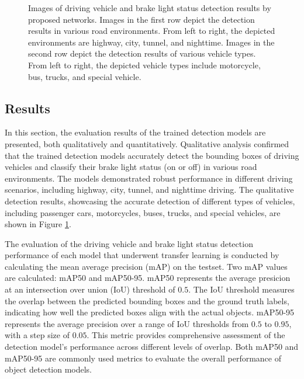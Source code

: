 \begin{figure}[t]%

    \hfill

\caption{Images of driving vehicle and brake light status detection results by proposed networks. Images in the first row depict the detection results in various road environments. From left to right, the depicted environments are highway, city, tunnel, and nighttime. Images in the second row depict the detection results of various vehicle types. From left to right, the depicted vehicle types include motorcycle, bus, trucks, and special vehicle.}
\label{fig:detection}%
\end{figure}




\subsection{Results}
\label{sec:exp_results}
In this section, the evaluation results of the trained detection models are presented, both qualitatively and quantitatively.
Qualitative analysis confirmed that the trained detection models accurately detect the bounding boxes of driving vehicles and classify their brake light status (on or off) in various road environments.
The models demonstrated robust performance in different driving scenarios, including highway, city, tunnel, and nighttime driving.
The qualitative detection results, showcasing the accurate detection of different types of vehicles, including passenger cars, motorcycles, buses, trucks, and special vehicles, are shown in Figure \ref{fig:detection}.

The evaluation of the driving vehicle and brake light status detection performance of each model that underwent transfer learning is conducted by calculating the mean average precision (mAP) on the testset.
Two mAP values are calculated: mAP50 and mAP50-95.
mAP50 represents the average presicion at an intersection over union (IoU) threshold of $0.5$. The IoU threshold measures the overlap between the predicted bounding boxes and the ground truth labels, indicating how well the predicted boxes align with the actual objects.
mAP50-95 represents the average precision over a range of IoU thresholds from $0.5$ to $0.95$, with a step size of $0.05$. 
This metric provides comprehensive assessment of the detection model's performance across different levels of overlap.
Both mAP50 and mAP50-95 are commonly used metrics to evaluate the overall performance of object detection models.

